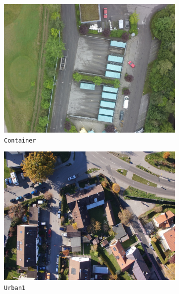 \begin{figure}[tbp]
\begin{subfigure}[b]{0.243\textwidth}
           \includegraphics[width=\textwidth]{figures_dataset/container_org_uav.jpg}
           \caption{\texttt{Container}}
       \end{subfigure}
       \hfill
       \begin{subfigure}[b]{0.243\textwidth}  
           \centering 
           \includegraphics[width=\textwidth]{figures_dataset/eichenau_org_uav.jpg}
           \caption{\texttt{Urban1}}
       \end{subfigure}
       \hfill
       \begin{subfigure}[b]{0.243\textwidth}   
           \centering 

\end{subfigure}
\end{figure}
